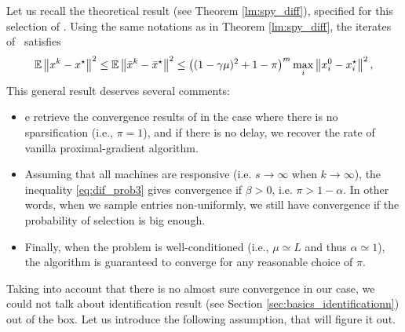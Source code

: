 Let us recall the theoretical result (see Theorem \ref{lm:spy_diff}), specified for this selection of \spyI. Using the same notations as in Theorem \ref{lm:spy_diff}, the iterates of \spyI~satisfies
\begin{align}
\label{eq:dif_prob3}
   \mathbb{E} \left\| x^k - x^\star \right\|^2 \le\mathbb{E} \left\| \bar{x}^k - \bar{x}^\star \right\|^2 \le\left( (1 - \gamma \mu)^2 + 1 - \pi  \right)^{m} \max_i\left\|x_i^0-x_i^\star\right\|^2,
\end{align}
This general result deserves several comments:
\begin{itemize}
\item {}e retrieve the convergence results of \cite{mishchenko2018} in the case where there is no sparsification (i.e., $\pi=1$), and if there is no delay, we recover the rate of vanilla proximal-gradient algorithm.
\item Assuming that all machines are responsive (i.e. $s\to \infty$ when $k\to\infty$), the inequality \eqref{eq:dif_prob3} gives convergence if $\beta > 0$, i.e. ${\pi} > {1 - \alpha}$. 
In other words, when we sample entries non-uniformly, we still have convergence if the probability of selection is big enough.
\item Finally, when the problem is well-conditioned (i.e., \;$\mu\simeq L$ and thus $\alpha\simeq 1$), the algorithm is guaranteed to converge for any reasonable choice of $\pi$.
\end{itemize}

Taking into account that there is no almost sure convergence in our case, we could not talk about identification result \cite{fadili2018sensitivity} (see Section \ref{sec:basics_identificationn}) out of the box. Let us introduce the following assumption, that will figure it out.


